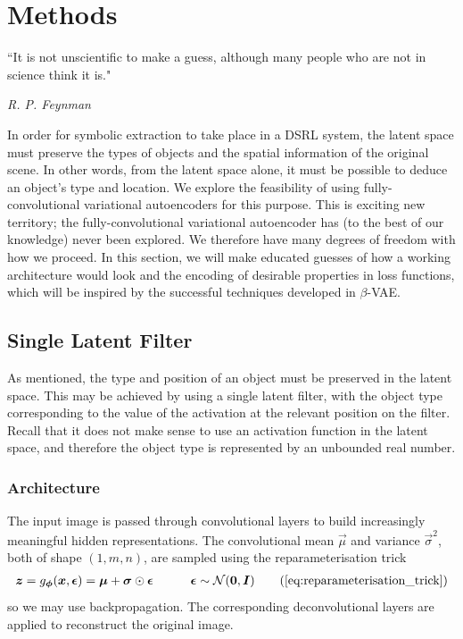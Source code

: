 \chapter{Methods}

\epigraph{``It is not unscientific to make a guess, although many people who are not in science think it is."}{\textit{R. P. Feynman}}

In order for symbolic extraction to take place in a DSRL system, the latent space must preserve the types of objects and the spatial information of the original scene. In other words, from the latent space alone, it must be possible to deduce an object's type and location. We explore the feasibility of using fully-convolutional variational autoencoders for this purpose. This is exciting new territory; the fully-convolutional variational autoencoder has (to the best of our knowledge) never been explored. We therefore have many degrees of freedom with how we proceed. In this section, we will make educated guesses of how a working architecture would look and the encoding of desirable properties in loss functions, which will be inspired by the successful techniques developed in $\beta$-VAE.


\label{ch:methods}


%
%
%
%
%
\section{Single Latent Filter}

As mentioned, the type and position of an object must be preserved in the latent space. This may be achieved by using a single latent filter, with the object type corresponding to the value of the activation at the relevant position on the filter. Recall that it does not make sense to use an activation function in the latent space, and therefore the object type is represented by an unbounded real number.


%
%
\subsection{Architecture}
The input image is passed through convolutional layers to build increasingly meaningful hidden representations. The convolutional mean $\vec{\mu}$ and variance $\vec{\sigma}^2$, both of shape $(1, m, n)$, are sampled using the reparameterisation trick
\begin{align}
\vec{z} = g_{\vec{\phi}}(\vec{x}, \vec{\epsilon}) = \vec{\mu} + \vec{\sigma} \odot \vec{\epsilon} \quad\quad\quad \vec{\epsilon} \sim \mathcal{N}(\vec{0}, \vec{I})
\tag{\ref{eq:reparameterisation_trick}}
\end{align}
so we may use backpropagation. The corresponding deconvolutional layers are applied to reconstruct the original image.\\

